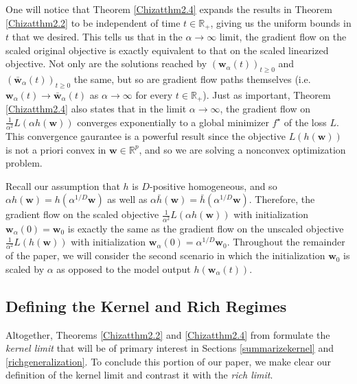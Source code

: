 \documentclass{article}
\begin{document}
One will notice that Theorem \ref{Chizatthm2.4} expands the results in Theorem \ref{Chizatthm2.2} to be independent of time $t \in \mathbb{R}_+$, giving us the uniform bounds in $t$ that we desired. This tells us that in the $\alpha \rightarrow \infty$ limit, the gradient flow on the scaled original objective is exactly equivalent to that on the scaled linearized objective. Not only are the solutions reached by $(\boldsymbol{w}_{\alpha}(t))_{t \geq 0}$ and $(\boldsymbol{\bar{w}}_{\alpha}(t))_{t \geq 0}$ the same, but so are gradient flow paths themselves (i.e. $\boldsymbol{w}_{\alpha}(t) \rightarrow \boldsymbol{\bar{w}}_{\alpha}(t)$ as $\alpha \rightarrow \infty$ for every $t \in \mathbb{R}_+$). Just as important, Theorem \ref{Chizatthm2.4} also states that in the limit $\alpha \rightarrow \infty$, the gradient flow on $\frac{1}{\alpha^2}L(\alpha h(\boldsymbol{w}))$ converges exponentially to a global minimizer $f^{\star}$ of the loss $L$. This convergence gaurantee is a powerful result since the objective $L(h(\boldsymbol{w}))$ is not a priori convex in $\boldsymbol{w} \in \mathbb{R}^p$, and so we are solving a nonconvex optimization problem.

Recall our assumption that $h$ is $D$-positive homogeneous, and so $\alpha h(\boldsymbol{w}) = h(\alpha^{1/D}\boldsymbol{w})$ as well as $\alpha \bar{h}(\boldsymbol{w}) = \bar{h}(\alpha^{1/D}\boldsymbol{w})$.
Therefore, the gradient flow on the scaled objective $\frac{1}{\alpha^2}L(\alpha h(\boldsymbol{w}))$ with initialization $\boldsymbol{w}_{\alpha}(0) = \boldsymbol{w}_0$ is exactly the same as the gradient flow on the unscaled objective $\frac{1}{\alpha^2}L(h(\boldsymbol{w}))$ with initialization $\boldsymbol{w}_{\alpha}(0) = \alpha^{1/D}\boldsymbol{w}_0$. Throughout the remainder of the paper, we will consider the second scenario in which the initialization $\boldsymbol{w}_0$ is scaled by $\alpha$ as opposed to the model output $h(\boldsymbol{w}_{\alpha}(t))$. 

\subsection{Defining the Kernel and Rich Regimes}\label{defkernelrich}

Altogether, Theorems \ref{Chizatthm2.2} and \ref{Chizatthm2.4} from \cite{chizat2018lazy} formulate the \textit{kernel limit} that will be of primary interest in Sections \ref{summarizekernel} and \ref{richgeneralization}. To conclude this portion of our paper, we make clear our definition of the kernel limit and contrast it with the \textit{rich limit}. 
\end{document}
